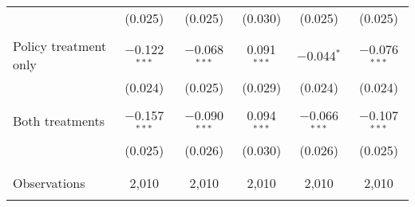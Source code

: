 \begin{tabular}{@{\extracolsep{5pt}}lccccc}
  & (0.025) & (0.025) & (0.030) & (0.025) & (0.025) \\ 
  & & & & & \\ 
 Policy treatment only & $-$0.122$^{***}$ & $-$0.068$^{***}$ & 0.091$^{***}$ & $-$0.044$^{*}$ & $-$0.076$^{***}$ \\ 
  & (0.024) & (0.025) & (0.029) & (0.024) & (0.024) \\ 
  & & & & & \\ 
 Both treatments & $-$0.157$^{***}$ & $-$0.090$^{***}$ & 0.094$^{***}$ & $-$0.066$^{***}$ & $-$0.107$^{***}$ \\ 
  & (0.025) & (0.026) & (0.030) & (0.026) & (0.025) \\ 
  & & & & & \\ 
\hline \\[-1.8ex] 

Observations & 2,010 & 2,010 & 2,010 & 2,010 & 2,010 \\ 
\hline 
\hline \\[-1.8ex] 
\end{tabular} 